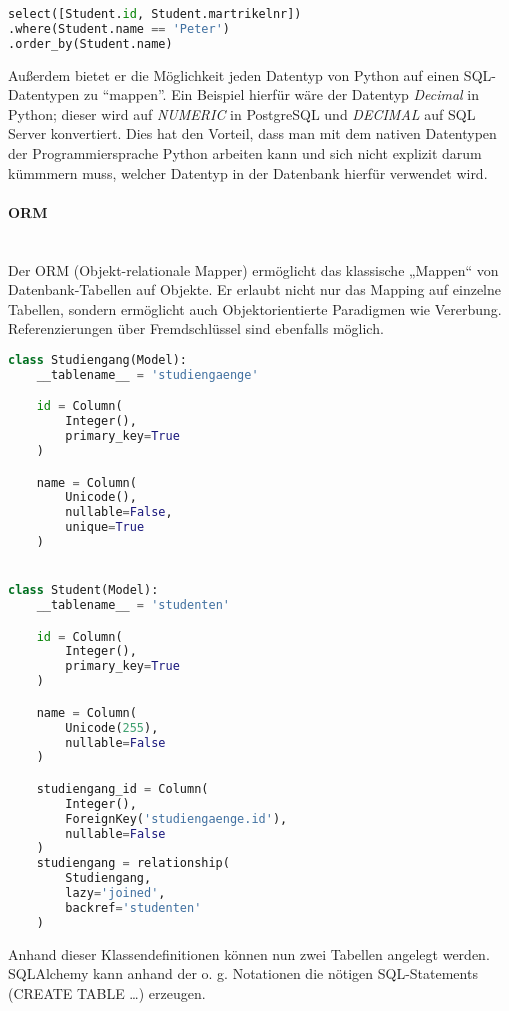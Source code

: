 \begin{lstlisting}[language=Python]
select([Student.id, Student.martrikelnr])
.where(Student.name == 'Peter')
.order_by(Student.name)
\end{lstlisting}

\hspace{0pt}

\noindent
Außerdem bietet er die Möglichkeit jeden Datentyp von Python auf einen SQL-Datentypen zu "`mappen"'. Ein Beispiel hierfür wäre der Datentyp \textit{Decimal} in Python; dieser wird auf \textit{NUMERIC} in PostgreSQL und \textit{DECIMAL} auf SQL Server konvertiert. Dies hat den Vorteil, dass man mit dem nativen Datentypen der Programmiersprache Python arbeiten kann und sich nicht explizit darum kümmmern muss, welcher Datentyp in der Datenbank hierfür verwendet wird.

\paragraph{ORM} \hspace{0pt} \\
Der ORM (Objekt-relationale Mapper) ermöglicht das klassische „Mappen“ von Datenbank-Tabellen auf Objekte. Er erlaubt nicht nur das Mapping auf einzelne Tabellen, sondern ermöglicht auch Objektorientierte Paradigmen wie Vererbung. Referenzierungen über Fremdschlüssel sind ebenfalls möglich.

\begin{lstlisting}[language=Python]
class Studiengang(Model):
    __tablename__ = 'studiengaenge'

    id = Column(
        Integer(),
        primary_key=True
    )

    name = Column(
        Unicode(),
        nullable=False,
        unique=True
    )


class Student(Model):
    __tablename__ = 'studenten'

    id = Column(
        Integer(),
        primary_key=True
    )

    name = Column(
        Unicode(255),
        nullable=False
    )

    studiengang_id = Column(
        Integer(),
        ForeignKey('studiengaenge.id'),
        nullable=False
    )
    studiengang = relationship(
        Studiengang,
        lazy='joined',
        backref='studenten'
    )
\end{lstlisting}


Anhand dieser Klassendefinitionen können nun zwei Tabellen angelegt werden. SQLAlchemy kann anhand der o. g. Notationen die nötigen SQL-Statements (CREATE TABLE …) erzeugen.

